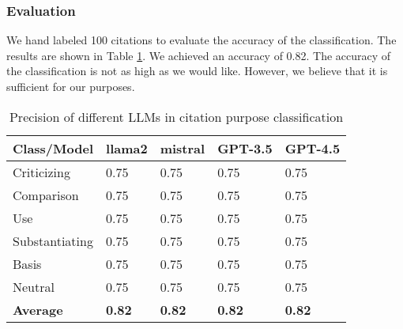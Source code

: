 \documentclass[sigconf]{acmart}
\begin{document}
\subsubsection{Evaluation}
We hand labeled 100 citations to evaluate the accuracy of the classification.
The results are shown in Table \ref{table:evaluation}. We achieved an accuracy of 0.82. The accuracy of the classification is not as high as we would like. However, we believe that it is sufficient for our purposes.

\begin{table}[h]
    \centering
    \begin{tabular}{|l|l|l|l|l|}
        \hline
        \textbf{Class/Model} & \textbf{llama2} & \textbf{mistral} & \textbf{GPT-3.5} & \textbf{GPT-4.5} \\ \hline
        Criticizing & 0.75 & 0.75 & 0.75 & 0.75 \\ \hline
        Comparison & 0.75 & 0.75 & 0.75 & 0.75 \\ \hline
        Use & 0.75 & 0.75 & 0.75 & 0.75 \\ \hline
        Substantiating & 0.75 & 0.75 & 0.75 & 0.75 \\ \hline
        Basis & 0.75 & 0.75 & 0.75 & 0.75 \\ \hline
        Neutral & 0.75 & 0.75 & 0.75 & 0.75 \\ \hline
        \textbf{Average} & \textbf{0.82} & \textbf{0.82} & \textbf{0.82} & \textbf{0.82} \\ \hline
    \end{tabular}
    \caption{Precision of different LLMs in citation purpose classification}
    \label{table:evaluation}
\end{table}
\end{document}
